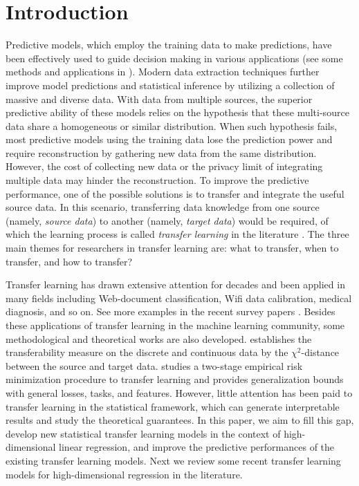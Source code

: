 \documentclass[twoside,12pt]{article}
\begin{document}
	\section{Introduction}
	\label{sec: intro}
	Predictive models, which employ the training data to make predictions, have been effectively used to guide decision making in various applications (see some methods and applications in \cite{fan2020statistical}).
	Modern data extraction techniques further improve model predictions and statistical inference by utilizing a collection of massive and diverse data.
	With data from multiple sources, the superior predictive ability of these models relies on the hypothesis that these multi-source data share a homogeneous or similar  distribution.
	When such hypothesis fails, most predictive models using the training data lose the prediction power and require reconstruction by gathering new data from the same distribution.
	However, the cost of collecting new data or the privacy limit of integrating multiple data may hinder the reconstruction.
	To improve the predictive performance, one of the possible solutions is to transfer and integrate the useful source data. 
	In this scenario, transferring data knowledge from one source (namely, \textit{source data}) to another (namely, \textit{target data}) would be required, of which the learning process is called \textit{transfer learning} in the literature \citep{olivas2009handbook}.
	The three main themes for researchers in transfer learning are: what to transfer, when to transfer, and how to transfer? 
	
	Transfer learning has drawn extensive attention for decades and been applied in many fields including Web-document classification, Wifi data calibration, medical diagnosis, and so on.
	See more examples in the recent survey papers \citep{pan2009survey,zhuang2020comprehensive}.
	Besides these applications of transfer learning in the machine learning community, some methodological and theoretical works are also developed.
	\cite{tong2021mathematical} establishes the transferability measure on the discrete and continuous data by the $\chi^2$-distance between the source and target data.
	\cite{tripuraneni2020theory} studies a two-stage empirical risk minimization procedure to transfer learning and provides generalization bounds with general losses, tasks, and features.
	However, little attention has been paid to transfer learning in the statistical framework, which can generate interpretable results and study the theoretical guarantees.
	In this paper, we aim to fill this gap, develop new statistical transfer learning models in the context of high-dimensional linear regression, and improve the predictive performances of the existing transfer learning models.
	Next we review some recent transfer learning models for high-dimensional regression in the literature.
		
\end{document}
